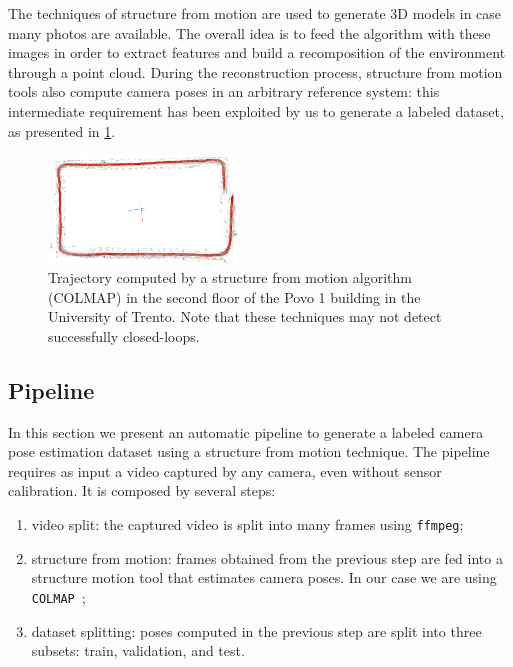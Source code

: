 The techniques of structure from motion are used to generate 3D models in case many photos are available. The overall idea is to feed the algorithm with these images in order to extract features and build a recomposition of the environment through a point cloud.
During the reconstruction process, structure from motion tools also compute camera poses in an arbitrary reference system: this intermediate requirement has been exploited by us to generate a labeled dataset, as presented in \cref{fig:trajectory-colmap}.

\begin{figure}[htbp]
    \begin{center}
        \includegraphics[width=0.45\textwidth]{./imgs/trajectory_colmap.png}
    \end{center}
    \caption{Trajectory computed by a structure from motion algorithm (COLMAP) in the second floor of the Povo 1 building in the University of Trento. Note that these techniques may not detect successfully closed-loops.}
    \label{fig:trajectory-colmap}
\end{figure}

\subsection{Pipeline}
In this section we present an automatic pipeline to generate a labeled camera pose estimation dataset using a structure from motion technique. The pipeline requires as input a video captured by any camera, even without sensor calibration. It is composed by several steps:
\begin{enumerate}
    \item video split: the captured video is split into many frames using \texttt{ffmpeg};
    \item structure from motion: frames obtained from the previous step are fed into a structure motion tool that estimates camera poses. In our case we are using \texttt{COLMAP}~\cite{colmap};
    \item dataset splitting: poses computed in the previous step are split into three subsets: train, validation, and test.
\end{enumerate}

